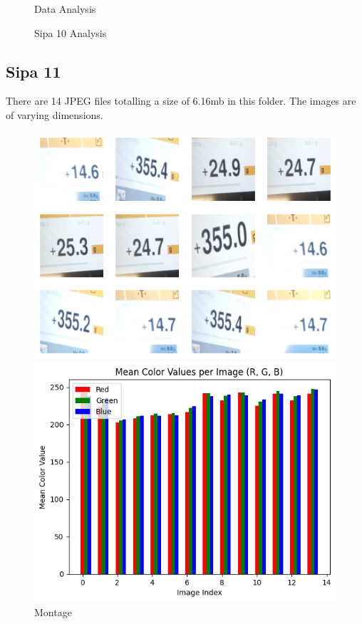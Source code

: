 \begin{figure}[ht]
\begin{minipage}[t]{0.50\textwidth}
        \caption*{Data Analysis}
    \end{minipage}
    \caption{Sipa 10 Analysis}
    \label{fig:Sipa 10 Analysis}
\end{figure}


\subsection{Sipa 11}

There are 14 JPEG files totalling a size of 6.16mb in this folder. The images are of varying dimensions.


\begin{figure}[ht]
    \centering
    \begin{minipage}[t]{0.25\textwidth}
        \centering
        \includegraphics[width=\textwidth]{Figures/EDA_Charts/11/montage.png}
        \caption*{Montage}
    \end{minipage}\hfill
    \begin{minipage}[t]{0.25\textwidth}
        \centering
        \includegraphics[width=\textwidth]{Figures/EDA_Charts/11/rgb.png}

\end{minipage}
\end{figure}
